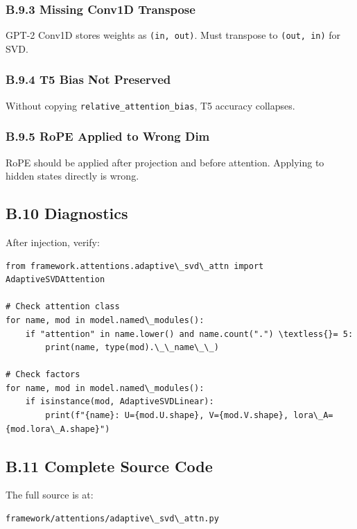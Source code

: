 \subsubsection{B.9.3 Missing Conv1D Transpose}

GPT-2 Conv1D stores weights as \texttt{(in, out)}. Must transpose to \texttt{(out, in)} 
for SVD.

\subsubsection{B.9.4 T5 Bias Not Preserved}

Without copying \texttt{relative\_attention\_bias}, T5 accuracy collapses.

\subsubsection{B.9.5 RoPE Applied to Wrong Dim}

RoPE should be applied after projection and before attention. Applying to 
hidden states directly is wrong.

\subsection{B.10 Diagnostics}

After injection, verify:

\begin{lstlisting}
from framework.attentions.adaptive\_svd\_attn import AdaptiveSVDAttention

# Check attention class
for name, mod in model.named\_modules():
    if "attention" in name.lower() and name.count(".") \textless{}= 5:
        print(name, type(mod).\_\_name\_\_)

# Check factors
for name, mod in model.named\_modules():
    if isinstance(mod, AdaptiveSVDLinear):
        print(f"{name}: U={mod.U.shape}, V={mod.V.shape}, lora\_A={mod.lora\_A.shape}")
\end{lstlisting}

\subsection{B.11 Complete Source Code}

The full source is at:

\begin{lstlisting}
framework/attentions/adaptive\_svd\_attn.py
\end{lstlisting}

